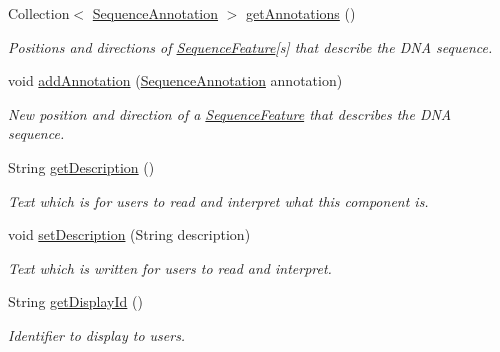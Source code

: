 \begin{DoxyCompactItemize}
\item 
Collection$<$ \hyperlink{classorg_1_1sbolstandard_1_1lib_s_b_o_lj_1_1_sequence_annotation}{SequenceAnnotation} $>$ \hyperlink{classorg_1_1sbolstandard_1_1lib_s_b_o_lj_1_1_dna_component_a0275a8297f992718e6fe7c8638c14010}{getAnnotations} ()
\begin{DoxyCompactList}\small\item\em Positions and directions of {\ttfamily \hyperlink{classorg_1_1sbolstandard_1_1lib_s_b_o_lj_1_1_sequence_feature}{SequenceFeature}}\mbox{[}s\mbox{]} that describe the DNA sequence. \item\end{DoxyCompactList}\item 
void \hyperlink{classorg_1_1sbolstandard_1_1lib_s_b_o_lj_1_1_dna_component_a642b2e7e1064f8f55a741e3d2945261f}{addAnnotation} (\hyperlink{classorg_1_1sbolstandard_1_1lib_s_b_o_lj_1_1_sequence_annotation}{SequenceAnnotation} annotation)
\begin{DoxyCompactList}\small\item\em New position and direction of a {\ttfamily \hyperlink{classorg_1_1sbolstandard_1_1lib_s_b_o_lj_1_1_sequence_feature}{SequenceFeature}} that describes the DNA sequence. \item\end{DoxyCompactList}\item 
String \hyperlink{classorg_1_1sbolstandard_1_1lib_s_b_o_lj_1_1_dna_component_ac7feffb7a33f63504ff1f87f19e2d2d8}{getDescription} ()
\begin{DoxyCompactList}\small\item\em Text which is for users to read and interpret what this component is. \item\end{DoxyCompactList}\item 
void \hyperlink{classorg_1_1sbolstandard_1_1lib_s_b_o_lj_1_1_dna_component_a1d15d718177c4f5411ce6ab339889fd4}{setDescription} (String description)
\begin{DoxyCompactList}\small\item\em Text which is written for users to read and interpret. \item\end{DoxyCompactList}\item 
String \hyperlink{classorg_1_1sbolstandard_1_1lib_s_b_o_lj_1_1_dna_component_aefe76199cb4d0096f487b280c411d843}{getDisplayId} ()
\begin{DoxyCompactList}\small\item\em Identifier to display to users. \item\end{DoxyCompactList}\item 

\end{DoxyCompactItemize}
